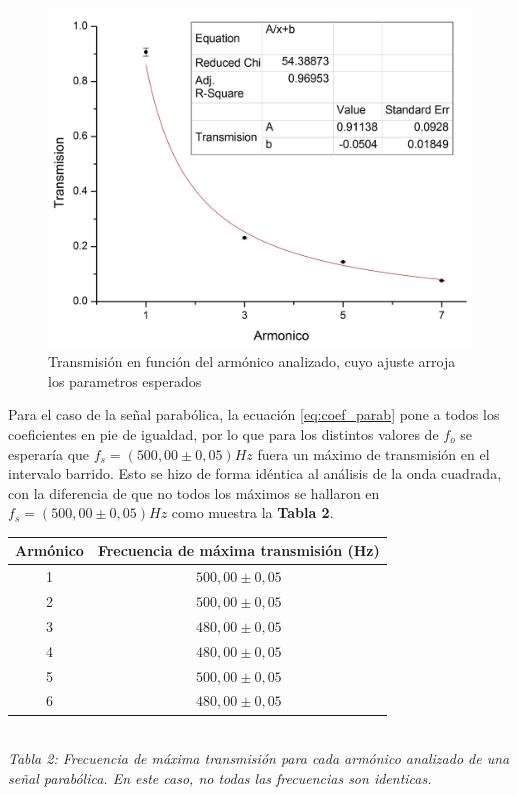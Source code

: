 \documentclass[11pt,a4paper]{article}
\begin{document}
\begin{figure}[h]
\centering
\includegraphics[scale=0.35]{Trans_vs_Arm_Cuad}
\caption{Transmisión en función del armónico analizado, cuyo ajuste arroja los parametros esperados}
\label{fig:transcuad}
\end{figure}

Para el caso de la señal parabólica, la ecuación \eqref{eq:coef_parab} pone a todos los coeficientes en pie de igualdad, por lo que para los distintos valores de $f_o$ se esperaría que $f_s = (500,00 \pm 0,05)Hz$ fuera un máximo de transmisión en el intervalo barrido. Esto se hizo de forma idéntica al análisis de la onda cuadrada, con la diferencia de que no todos los máximos se hallaron en $f_s = (500,00 \pm 0,05)Hz$ como muestra la \textbf{Tabla 2}.

\begin{center}
\begin{tabular}{||c|c||}
\hline 
\textbf{Armónico} & \textbf{Frecuencia de máxima transmisión (Hz)} \\ \hline 
 1 & $500,00 \pm 0,05$ \\ \hline 
 2 & $500,00 \pm 0,05$ \\ \hline 
 3 & $480,00 \pm 0,05$ \\ \hline 
 4 & $480,00 \pm 0,05$ \\ \hline 
 5 & $500,00 \pm 0,05$ \\ \hline 
 6 & $480,00 \pm 0,05$ \\ \hline 
\end{tabular}\\[0.3cm]
\textit{Tabla 2: Frecuencia de máxima transmisión para cada armónico analizado de una señal parabólica. En este caso, no todas las frecuencias son identicas.}
\end{center}
\end{document}
